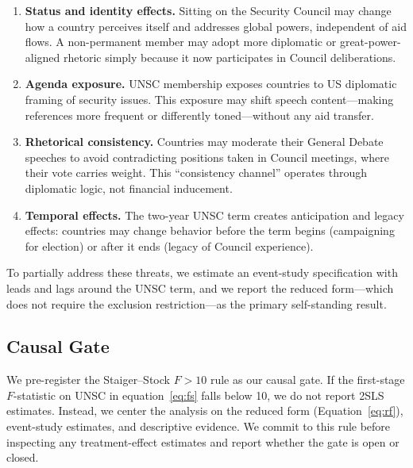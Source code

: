 \begin{enumerate}
\item \textbf{Status and identity effects.} Sitting on the Security Council may change how a country perceives itself and addresses global powers, independent of aid flows. A non-permanent member may adopt more diplomatic or great-power-aligned rhetoric simply because it now participates in Council deliberations.
\item \textbf{Agenda exposure.} UNSC membership exposes countries to US diplomatic framing of security issues. This exposure may shift speech content---making references more frequent or differently toned---without any aid transfer.
\item \textbf{Rhetorical consistency.} Countries may moderate their General Debate speeches to avoid contradicting positions taken in Council meetings, where their vote carries weight. This ``consistency channel'' operates through diplomatic logic, not financial inducement.
\item \textbf{Temporal effects.} The two-year UNSC term creates anticipation and legacy effects: countries may change behavior before the term begins (campaigning for election) or after it ends (legacy of Council experience).
\end{enumerate}

To partially address these threats, we estimate an event-study specification with leads and lags around the UNSC term, and we report the reduced form---which does not require the exclusion restriction---as the primary self-standing result.

\subsection{Causal Gate}

We pre-register the Staiger--Stock \citep{staiger1997instrumental} $F>10$ rule as our causal gate. If the first-stage $F$-statistic on UNSC in equation~\ref{eq:fs} falls below 10, we do not report 2SLS estimates. Instead, we center the analysis on the reduced form (Equation~\ref{eq:rf}), event-study estimates, and descriptive evidence. We commit to this rule before inspecting any treatment-effect estimates and report whether the gate is open or closed.
